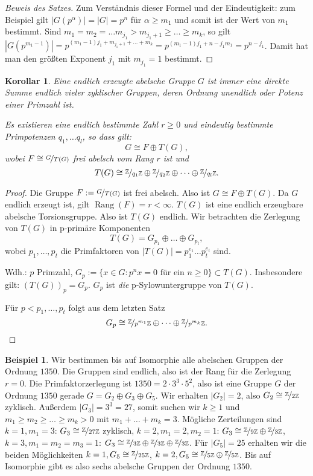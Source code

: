 \documentclass[12pt]{scrartcl} %
\DeclareMathOperator{\rank}{Rang}
\newcommand\Z{\mathbb{Z}}
\newtheorem{kor}{Korollar}
\theoremstyle{definition}
\newtheorem{ex}{Beispiel}
\theoremstyle{remark}
\begin{document}
\begin{proof}[Beweis des Satzes]
	Zum Verständnis dieser Formel und der Eindeutigkeit: zum Beispiel gilt $|G(p^{\alpha})|=|G|=p^n$ für $\alpha\geq m_1$ und somit ist der Wert von $m_1$ bestimmt. Sind $m_1=m_2=\dots m_{j_1}>m_{j_1+1}\geq\dots\geq m_k$, so gilt $|G(p^{m_1-1})|=p^{(m_1-1)j_1+m_{j_1+1}+\dots+m_k}=p^{(m_1-1)j_1+n-j_1m_1} = p^{n-j_1}$. Damit hat man den größten Exponent $j_1$ mit $m_{j_1}=1$ bestimmt.
\end{proof}

\begin{kor}
	Eine endlich erzeugte abelsche Gruppe $G$ ist immer eine direkte Summe endlich vieler zyklischer Gruppen, deren Ordnung unendlich oder Potenz einer Primzahl ist.
	
	Es existieren eine endlich bestimmte Zahl $r\geq 0$ und eindeutig bestimmte Primpotenzen $q_1,\dots q_l$, so dass gilt:
	\[ G\cong F\oplus T(G), \]
wobei $F\cong \nicefrac{G}{T(G)}$ frei abelsch vom Rang $r$ ist und 
	\[ T(G) \cong \nicefrac{\Z}{q_1\Z}\oplus\nicefrac{\Z}{q_2\Z}\oplus\dots\oplus\nicefrac{\Z}{q_l\Z}.\]
\end{kor}

\begin{proof}
	Die Gruppe $F:=\nicefrac{G}{T(G)}$ ist frei abelsch. Also ist $G\cong F\oplus T(G)$. Da $G$ endlich erzeugt ist, gilt $\rank(F)=r<\infty$. $T(G)$ ist eine endlich erzeugbare abelsche Torsionsgruppe. Also ist $T(G)$ endlich. Wir betrachten die Zerlegung von $T(G)$ in p-primäre Komponenten
	\[ T(G) = G_{p_1}\oplus\dots\oplus G_{p_t}, \]
	wobei $p_1,\dots,p_t$ die Primfaktoren von $|T(G)|=p_1^{e_1}\dots p_t^{e_t}$ sind.
	
	Wdh.: $p$ Primzahl, $G_p := \{x\in G: p^nx=0\text{ für ein $n\geq 0$}\}\subset T(G)$. Insbesondere gilt: $\left(T(G)\right)_p=G_p$. $G_p$ ist \emph{die} p-Sylowuntergruppe von $T(G)$.
	
	Für $p<p_1,\dots,p_t$ folgt aus dem letzten Satz
		\[ G_p \cong \nicefrac{\Z}{p^{m_1}\Z}\oplus\dots\oplus\nicefrac{\Z}{p^{m_k}\Z}.\]
\end{proof}

\begin{ex}
	Wir bestimmen bis auf Isomorphie alle abelschen Gruppen der Ordnung $1350$. Die Gruppen sind endlich, also ist der Rang für die Zerlegung $r=0$. Die Primfaktorzerlegung ist $1350=2\cdot 3^3\cdot 5^2$, also ist eine Gruppe $G$ der Ordnung $1350$ gerade $G = G_2\oplus G_3\oplus G_5$. Wir erhalten $|G_2|=2$, also $G_2\cong\nicefrac{\Z}{2\Z}$ zyklisch. Außerdem $|G_3|=3^3=27$, somit suchen wir $k\geq 1$ und $m_1\geq m_2\geq\dots\geq m_k>0$ mit $m_1+\dots +m_k=3$. Mögliche Zerteilungen sind $k=1,m_1=3$: $G_3\cong\nicefrac{\Z}{27\Z}$ zyklisch,
	 $k=2,m_1=2,m_2=1$: $G_3\cong\nicefrac{\Z}{9\Z}\oplus\nicefrac{\Z}{3\Z}$,
	 $k=3,m_1=m_2=m_3=1$: $G_3\cong\nicefrac{\Z}{3\Z}\oplus\nicefrac{\Z}{3\Z}\oplus\nicefrac{\Z}{3\Z}$. Für $|G_5|=25$ erhalten wir die beiden Möglichkeiten $k=1, G_5\cong\nicefrac{\Z}{25\Z}$, $k=2,G_5\cong\nicefrac{\Z}{5\Z}\oplus\nicefrac{\Z}{5\Z}$. Bis auf Isomorphie gibt es also sechs abelsche Gruppen der Ordnung $1350$.
\end{ex}
\end{document}
